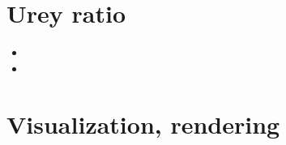 
\section{Urey ratio}

\begin{small}
\begin{itemize}
\item[\twothousandeight] 
\item[\twothousandtwelve] 
\end{itemize}
\end{small}










\section{Visualization, rendering}

